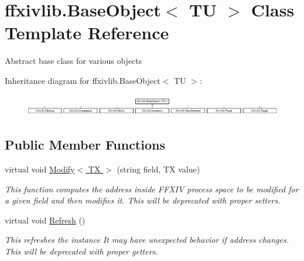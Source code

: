 \hypertarget{classffxivlib_1_1_base_object_3_01_t_u_01_4}{\section{ffxivlib.\-Base\-Object$<$ T\-U $>$ Class Template Reference}
\label{classffxivlib_1_1_base_object_3_01_t_u_01_4}
}


Abstract base class for various objects  


Inheritance diagram for ffxivlib.\-Base\-Object$<$ T\-U $>$\-:\begin{figure}[H]
\begin{center}
\leavevmode
\includegraphics[height=0.969697cm]{classffxivlib_1_1_base_object_3_01_t_u_01_4}
\end{center}
\end{figure}
\subsection*{Public Member Functions}
\begin{DoxyCompactItemize}
\item 
virtual void \hyperlink{classffxivlib_1_1_base_object_3_01_t_u_01_4_aa91f90297fae776b0b80a21b6055625e}{Modify$<$ T\-X $>$} (string field, T\-X value)
\begin{DoxyCompactList}\small\item\em This function computes the address inside F\-F\-X\-I\-V process space to be modified for a given field and then modifies it. This will be deprecated with proper setters. \end{DoxyCompactList}\item 
virtual void \hyperlink{classffxivlib_1_1_base_object_3_01_t_u_01_4_a22d6f6d332514c8c3e73b906ba8b9d8e}{Refresh} ()
\begin{DoxyCompactList}\small\item\em This refreshes the instance It may have unexpected behavior if address changes. This will be deprecated with proper getters. \end{DoxyCompactList}\end{DoxyCompactItemize}
